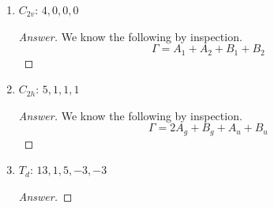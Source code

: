 \documentclass[../psets.tex]{subfiles}
\begin{document}
\begin{enumerate}[label={\Roman*)}]
\begin{enumerate}[label={\alph*)}]
\begin{proof}[Answer]
\begin{align*}
                \hspace{-4em}a_{A_2'}  &= \frac{1}{12}\sum_{R_c}g_c\chi_\Gamma(R_c)\chi_{A_2'}(R_c)  = \frac{1}{12}[(1)(3)(1)+(2)(0)(1)+(3)(-1)(-1)+(1)(-3)(1)+(2)(0)(1)+(3)(1)(-1)] = 0\\
                \hspace{-4em}a_{E'}    &= \frac{1}{12}\sum_{R_c}g_c\chi_\Gamma(R_c)\chi_{E'}(R_c)    = \frac{1}{12}[(1)(3)(2)+(2)(0)(-1)+(3)(-1)(0)+(1)(-3)(2)+(2)(0)(-1)+(3)(1)(0)] = 0\\
                \hspace{-4em}a_{A_1''} &= \frac{1}{12}\sum_{R_c}g_c\chi_\Gamma(R_c)\chi_{A_1''}(R_c) = \frac{1}{12}[(1)(3)(1)+(2)(0)(1)+(3)(-1)(1)+(1)(-3)(-1)+(2)(0)(-1)+(3)(1)(-1)] = 0\\
                \hspace{-4em}a_{A_2''} &= \frac{1}{12}\sum_{R_c}g_c\chi_\Gamma(R_c)\chi_{A_2''}(R_c) = \frac{1}{12}[(1)(3)(1)+(2)(0)(1)+(3)(-1)(-1)+(1)(-3)(-1)+(2)(0)(-1)+(3)(1)(1)] = 1\\
                \hspace{-4em}a_{E''}   &= \frac{1}{12}\sum_{R_c}g_c\chi_\Gamma(R_c)\chi_{E''}(R_c)   = \frac{1}{12}[(1)(3)(2)+(2)(0)(-1)+(3)(-1)(0)+(1)(-3)(-2)+(2)(0)(1)+(3)(1)(0)] = 1
            \end{align*}
            Therefore, we know that
            \begin{equation*}
                \boxed{\Gamma = A_2''+E''}
            \end{equation*}
        \end{proof}
        \item $C_{2v}$: $4,0,0,0$
        \begin{proof}[Answer]
            We know the following by inspection.
            \begin{equation*}
                \boxed{\Gamma = A_1+A_2+B_1+B_2}
            \end{equation*}
        \end{proof}
        \item $C_{2h}$: $5,1,1,1$
        \begin{proof}[Answer]
            We know the following by inspection.
            \begin{equation*}
                \boxed{\Gamma = 2A_g+B_g+A_u+B_u}
            \end{equation*}
        \end{proof}
        \item $T_d$: $13,1,5,-3,-3$
        \begin{proof}[Answer]

\end{proof}
\end{enumerate}
\end{enumerate}
\end{document}
